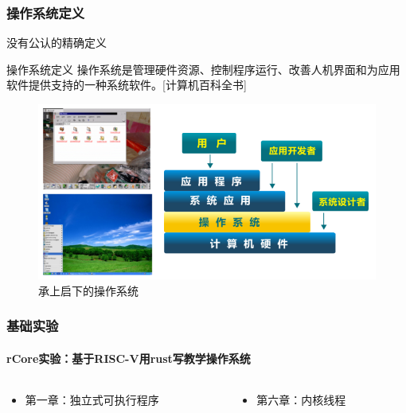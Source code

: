 \begin{frame}[plain]	
	\frametitle{}
	
	
\end{frame}
\begin{frame}[plain]
	
	\frametitle{操作系统定义}
	
	
	没有公认的精确定义 \pause
	
	\begin{block}{操作系统定义}
		操作系统是管理硬件资源、控制程序运行、改善人机界面和为应用软件提供支持的一种系统软件。[计算机百科全书]
	\end{block} \pause
	
	
	\begin{figure}
		\centering
		\includegraphics[width=0.5\linewidth]{os-position}
		\caption{承上启下的操作系统}
	\end{figure}
	
\end{frame}

\begin{frame}
	\frametitle{基础实验}
	\framesubtitle{rCore实验：基于RISC-V用rust写教学操作系统} \pause

	\begin{columns}

		\begin{column}{0.5\textwidth}
			\begin{itemize}
				\item 第一章：独立式可执行程序
			\end{itemize}
		\end{column}
		
		\begin{column}{0.5\textwidth}
			\begin{itemize}
				\item 第六章：内核线程
			\end{itemize}
		\end{column}
		
	\end{columns}

\end{frame}


